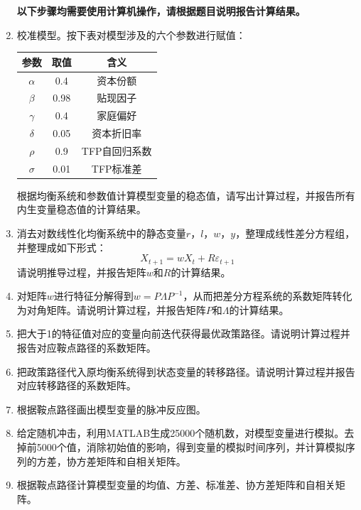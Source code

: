\documentclass[12pt, a4paper, oneside]{article}
\newcounter{problemname}
\newenvironment{problem}{\stepcounter{problemname}\par\noindent\textbf{}}{\par}
\begin{document}
\begin{CJK*}{UTF8}{gbsn}
\begin{problem}
\begin{enumerate}
\textbf{以下步骤均需要使用计算机操作，请根据题目说明报告计算结果。}
\item 校准模型。按下表对模型涉及的六个参数进行赋值：
\begin{center}
	\begin{tabular}{ccc}
		\hline
		参数 & 取值 & 含义\\
	 	\hline
		$\alpha$ & 0.4 & 资本份额\\
		$\beta$ & 0.98 & 贴现因子\\
		$\gamma$ & 0.4 & 家庭偏好\\
		$\delta$ & 0.05 & 资本折旧率\\
		$\rho$ & 0.9 & TFP自回归系数\\
		$\sigma$ & 0.01 & TFP标准差\\
		\hline
	\end{tabular}
\end{center}
根据均衡系统和参数值计算模型变量的稳态值，请写出计算过程，并报告所有内生变量稳态值的计算结果。
\item 消去对数线性化均衡系统中的静态变量$r$，$l$，$w$，$y$，整理成线性差分方程组，并整理成如下形式：
\begin{equation}
X_{t+1}=w X_{t}+R\varepsilon_{t+1}
\end{equation}
请说明推导过程，并报告矩阵$w$和$R$的计算结果。
\item 对矩阵$w$进行特征分解得到$w=P\Lambda P^{-1}$，从而把差分方程系统的系数矩阵转化为对角矩阵。请说明计算过程，并报告矩阵$P$和$\Lambda$的计算结果。
\item 把大于1的特征值对应的变量向前迭代获得最优政策路径。请说明计算过程并报告对应鞍点路径的系数矩阵。
\item 把政策路径代入原均衡系统得到状态变量的转移路径。请说明计算过程并报告对应转移路径的系数矩阵。
\item 根据鞍点路径画出模型变量的脉冲反应图。
\item 给定随机冲击，利用MATLAB生成25000个随机数，对模型变量进行模拟。去掉前5000个值，消除初始值的影响，得到变量的模拟时间序列，并计算模拟序列的方差，协方差矩阵和自相关矩阵。
\item 根据鞍点路径计算模型变量的均值、方差、标准差、协方差矩阵和自相关矩阵。


\end{enumerate}
\end{problem}
\end{CJK*}
\end{document}
